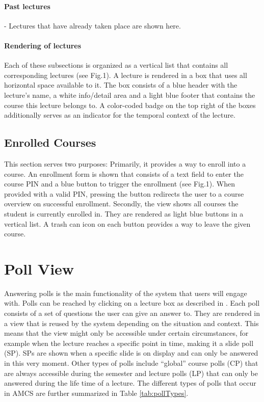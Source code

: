 \paragraph{Past lectures} - Lectures that have already taken place are shown here.

\paragraph{Rendering of lectures}

Each of these subsections is organized as a vertical list that contains all corresponding lectures (see Fig.1). A lecture is rendered in a box that uses all horizontal space available to it. The box consists of a blue header with the lecture's name, a white info/detail area and a light blue footer that contains the course this lecture belongs to.
A color-coded badge on the top right of the boxes additionally serves as an indicator for the temporal context of the lecture.

\subsection{Enrolled Courses}

This section serves two purposes: Primarily, it provides a way to enroll into a course. An enrollment form is shown that consists of a text field to enter the course PIN and a blue button to trigger the enrollment (see Fig.1). When provided with a valid PIN, pressing the button redirects the user to a course overview on successful enrollment.
Secondly, the view shows all courses the student is currently enrolled in. They are rendered as light blue buttons in a vertical list. A trash can icon on each button provides a way to leave the given course.


\section{Poll View}
Answering polls is the main functionality of the system that users will engage with.
Polls can be reached by clicking on a lecture box as described in \todosct.
Each poll consists of a set of questions the user can give an answer to. They are rendered in a view that is reused  by the system depending on the situation and context. This means that the view might only be accessible under certain circumstances, for example when the lecture reaches a specific point in time, making it a slide poll (SP). SPs are shown when a specific slide is on display and can only be answered in this very moment. Other types of polls include “global” course polls (CP) that are always accessible during the semester and lecture polls (LP) that can only be answered during the life time of a lecture. The different types of polls that occur in AMCS are further summarized in Table \ref{tab:pollTypes}.

